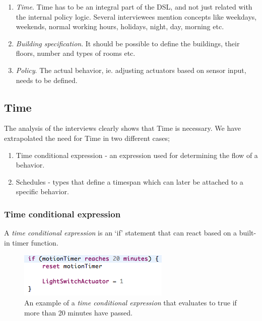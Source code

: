 \documentclass{llncs}
\begin{document}
\begin{enumerate}
	\item \textit{Time}. Time has to be an integral part of the DSL, and not just related with the internal policy logic. Several interviewees mention concepts like weekdays, weekends, normal working hours, holidays, night, day, morning etc.
	
	\item \textit{Building specification}. It should be possible to define the buildings, their floors, number and types of rooms etc.

	\item \textit{Policy}. The actual behavior, ie. adjusting actuators based on sensor input, needs to be defined. 
\end{enumerate}

\subsection{Time}\label{subsec:time}
The analysis of the interviews clearly shows that Time is necessary. We have extrapolated the need for Time in two different cases;
	\begin{enumerate}
		\item Time conditional expression - an expression used for determining the flow of a behavior.
		\item Schedules - types that define a timespan which can later be attached to a specific behavior.
	\end{enumerate}

\subsubsection{Time conditional expression}\label{subsubsec:conditionalexpression}
A \textit{time conditional expression} is an `if' statement that can react based on a built-in timer function. 

\begin{figure}
  \centering
    \includegraphics[scale=.5]{dsl-conditional-time-expression.png} 
	\caption{An example of a \textit{time conditional expression} that evaluates to true if more than 20 minutes have passed.}
	\label{fig:dsl-conditionalexpression}
\end{figure}
\end{document}
